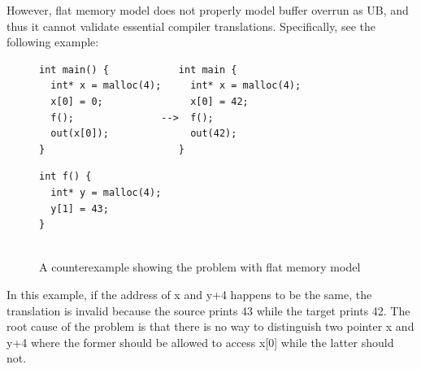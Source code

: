 However, flat memory model does not properly model buffer overrun as UB, and thus it cannot validate essential compiler translations.
Specifically, see the following example:
\begin{figure}[h]
\begin{minipage}{1.2\linewidth}
\begin{minipage}{0.60\linewidth}
\begin{Verbatim}[frame=single]
int main() {            int main {
  int* x = malloc(4);     int* x = malloc(4);
  x[0] = 0;               x[0] = 42;
  f();               -->  f();
  out(x[0]);              out(42);
}                       }
\end{Verbatim}
\end{minipage}
\hspace*{-2.7mm}
\begin{minipage}{0.3\linewidth}
\begin{Verbatim}[frame=single]
int f() {
  int* y = malloc(4);
  y[1] = 43;
}


\end{Verbatim}
\end{minipage}
\end{minipage}
\caption{A counterexample showing the problem with flat memory model}
\label{fig:flat-model}
\end{figure}

\noindent In this example, if the address of x and y+4 happens to be the same, the translation is invalid because the source prints 43 while the target prints 42.
The root cause of the problem is that there is no way to distinguish two pointer x and y+4 where the former should be allowed to access x[0] while the latter should not.


